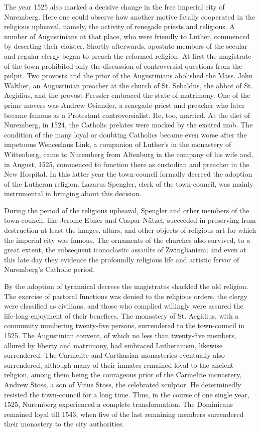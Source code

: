 The year 1525 also marked a decisive change in the free imperial
city of Nuremberg. Here one could observe how another motive fatally cooperated
in the religious upheaval, namely, the activity of
renegade priests and religious. A number of Augustinians at that
place, who were friendly to Luther, commenced by deserting their
cloister. Shortly afterwards, apostate members of the secular and
regular clergy began to preach the reformed religion. At first the
magistrate of the town prohibited only the discussion of controversial
questions from the pulpit. Two provosts and the prior of the
Augustinians abolished the Mass. John Walther, an Augustinian
preacher at the church of St. Sebaldus, the abbot of St. Aegidius, and
the provost Pressler embraced the state of matrimony. One of the
prime movers was Andrew Osiander, a renegade priest and preacher
who later became famous as a Protestant controversialist. He, too,
married. At the diet of Nuremberg, in 1524, the Catholic prelates
were mocked by the excited mob. The condition of the many loyal
or doubting Catholics became even worse after the impetuous Wenceslaus
Link, a companion of Luther’s in the monastery of Wittenberg,
came to Nuremberg from Altenburg in the company of his
wife and, in August, 1525, commenced to function there as custodian
and preacher in the New Hospital. In this latter year the town-council
formally decreed the adoption of the Lutheran religion. Lazarus
Spengler, clerk of the town-council, was mainly instrumental
in bringing about this decision.

During the period of the religious upheaval, Spengler and other
members of the town-council, like Jerome Ebner and Caspar Nützel,
succeeded in preserving from destruction at least the images, altars,
and other objects of religious art for which the imperial city
was famous. The ornaments of the churches also survived, to a great
extent, the subsequent iconoclastic assaults of Zwinglianism; and even
at this late day they evidence the profoundly religious life and artistic
fervor of Nuremberg’s Catholic period.

By the adoption of tyrannical decrees the magistrates shackled the
old religion. The exercise of pastoral functions was denied to the religious
orders, the clergy were classified as civilians, and those who
complied willingly were assured the life-long enjoyment of their
benefices. The monastery of St. Aegidius, with a community numbering twenty-five
persons, surrendered to the town-council in 1525.
The Augustinian convent, of which no less than twenty-five members, allured
by liberty and matrimony, had embraced Lutheranism,
likewise surrendered. The Carmelite and Carthusian monasteries
eventually also surrendered, although many of their inmates remained
loyal to the ancient religion, among them being the courageous prior
of the Carmelite monastery, Andrew Stoss, a son of Vitus Stoss, the
celebrated sculptor. He determinedly resisted the town-council for
a long time. Thus, in the course of one single year, 1525, Nuremberg
experienced a complete transformation. The Dominicans remained
loyal till 1543, when five of the last remaining members surrendered
their monastery to the city authorities.

